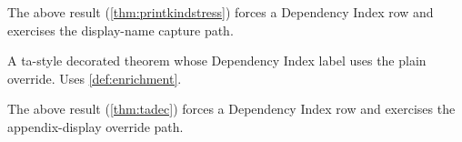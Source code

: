 \documentclass{article}
\numberwithin{equation}{section}
\begin{document}
The above result (\cref{thm:printkindstress}) forces a Dependency Index row
and exercises the display-name capture path.

\begin{tadec}\label{thm:tadec}
A ta-style decorated theorem whose Dependency Index label uses the plain override.
Uses \cref{def:enrichment}.
\end{tadec}

The above result (\cref{thm:tadec}) forces a Dependency Index row
and exercises the appendix-display override path.


\codepappendix

\END
\end{document}
